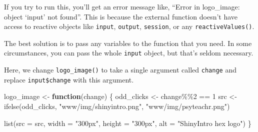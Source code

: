 \documentclass[
]{book}
\newenvironment{Shaded}{\begin{snugshade}}{\end{snugshade}}
\newcommand{\AttributeTok}[1]{\textcolor[rgb]{0.77,0.63,0.00}{#1}}
\newcommand{\ControlFlowTok}[1]{\textcolor[rgb]{0.13,0.29,0.53}{\textbf{#1}}}
\newcommand{\DecValTok}[1]{\textcolor[rgb]{0.00,0.00,0.81}{#1}}
\newcommand{\FunctionTok}[1]{\textcolor[rgb]{0.00,0.00,0.00}{#1}}
\newcommand{\NormalTok}[1]{#1}
\newcommand{\OtherTok}[1]{\textcolor[rgb]{0.56,0.35,0.01}{#1}}
\newcommand{\SpecialCharTok}[1]{\textcolor[rgb]{0.00,0.00,0.00}{#1}}
\newcommand{\StringTok}[1]{\textcolor[rgb]{0.31,0.60,0.02}{#1}}
\begin{document}
\begin{Shaded}
\end{Shaded}

If you try to run this, you'll get an error message like, ``Error in logo\_image: object `input' not found''. This is because the external function doesn't have access to reactive objects like \texttt{input}, \texttt{output}, \texttt{session}, or any \texttt{reactiveValues()}.

The best solution is to pass any variables to the function that you need. In some circumstances, you can pass the whole \texttt{input} object, but that's seldom necessary.

Here, we change \texttt{logo\_image()} to take a single argument called \texttt{change} and replace \texttt{input\$change} with this argument.

\begin{Shaded}
\begin{Highlighting}[]
\NormalTok{logo\_image }\OtherTok{\textless{}{-}} \ControlFlowTok{function}\NormalTok{(change) \{}
\NormalTok{  odd\_clicks }\OtherTok{\textless{}{-}}\NormalTok{ change}\SpecialCharTok{\%\%}\DecValTok{2} \SpecialCharTok{==} \DecValTok{1}
\NormalTok{  src }\OtherTok{\textless{}{-}} \FunctionTok{ifelse}\NormalTok{(odd\_clicks, }
                \StringTok{"www/img/shinyintro.png"}\NormalTok{, }
                \StringTok{"www/img/psyteachr.png"}\NormalTok{)}
  
  \FunctionTok{list}\NormalTok{(}\AttributeTok{src =}\NormalTok{ src,}
       \AttributeTok{width =} \StringTok{"300px"}\NormalTok{,}
       \AttributeTok{height =} \StringTok{"300px"}\NormalTok{,}
       \AttributeTok{alt =} \StringTok{"ShinyIntro hex logo"}\NormalTok{)}
\NormalTok{\}}
\end{Highlighting}
\end{Shaded}
\end{document}
